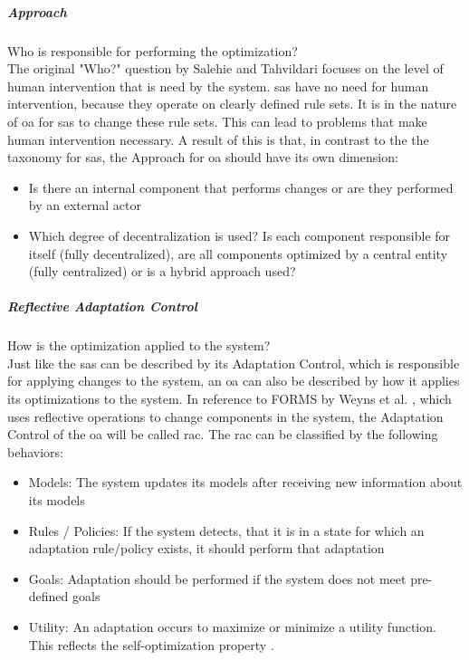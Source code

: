 \subparagraph*{Approach}
Who is responsible for performing the optimization? \\
The original "Who?" question by Salehie and Tahvildari focuses on the level of human intervention that is need by the system.
\acrshort{sas} have no need for human intervention, because they operate on clearly defined rule sets.
It is in the nature of \acrshort{oa} for \acrshort{sas} to change these rule sets.
This can lead to problems that make human intervention necessary.
A result of this is that, in contrast to the the taxonomy for \acrshort{sas}, 
the Approach for \acrshort{oa} should have its own dimension:
\begin{itemize}[nosep]
    \item Is there an internal component that performs changes or are they performed by an external actor
    \item Which degree of decentralization is used?
    Is each component responsible for itself (fully decentralized), are all components optimized by a central entity (fully centralized)
    or is a hybrid approach used?
\end{itemize}

\subparagraph*{Reflective Adaptation Control}
How is the optimization applied to the system? \\
Just like the \acrshort{sas} can be described by its Adaptation Control,
which is responsible for applying changes to the system,
an \acrshort{oa} can also be described by how it applies its optimizations to the system.
In reference to FORMS by Weyns et al. \cite*{FORMS}, which uses reflective operations to change
components in the system, the Adaptation Control of the \acrshort{oa} will be called \acrshort{rac}.
The \acrshort{rac} can be classified by the following behaviors:
\begin{itemize}[nosep]
    \item Models: The system updates its models after receiving new information about its models
    \item Rules / Policies: If the system detects, that it is in a state for which an adaptation rule/policy exists,
    it should perform that adaptation
    \item Goals: Adaptation should be performed if the system does not meet pre-defined goals
    \item Utility: An adaptation occurs to maximize or minimize a utility function.
    This reflects the self-optimization property \cite*{DissectingSelfProperties}.
\end{itemize}

